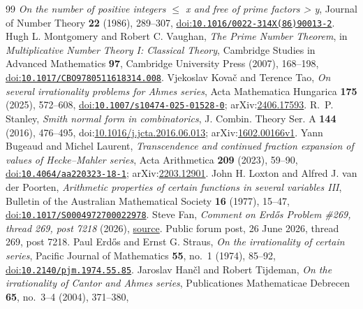 \begin{thebibliography}{99}
  \emph{On the number of positive integers $\le$ x and free of prime factors > y}, Journal of Number Theory \textbf{22} (1986), 289--307,
  \href{https://doi.org/10.1016/0022-314X(86)90013-2}{doi:\nolinkurl{10.1016/0022-314X(86)90013-2}}.
 Hugh L. Montgomery and Robert C. Vaughan,
  \emph{The Prime Number Theorem}, in \emph{Multiplicative Number Theory I: Classical Theory}, Cambridge Studies in Advanced Mathematics \textbf{97}, Cambridge University Press (2007), 168--198,
  \href{https://doi.org/10.1017/CBO9780511618314.008}{doi:\nolinkurl{10.1017/CBO9780511618314.008}}.
 Vjekoslav Kova\v{c} and Terence Tao,
  \emph{On several irrationality problems for Ahmes series}, Acta Mathematica Hungarica \textbf{175} (2025), 572--608,
  \href{https://doi.org/10.1007/s10474-025-01528-0}{doi:\nolinkurl{10.1007/s10474-025-01528-0}}; arXiv:\href{https://arxiv.org/abs/2406.17593}{2406.17593}.
 R.~P. Stanley, \emph{Smith normal form in combinatorics},
  J. Combin. Theory Ser. A \textbf{144} (2016), 476--495,
  doi:\href{https://doi.org/10.1016/j.jcta.2016.06.013}{10.1016/j.jcta.2016.06.013};
  arXiv:\href{https://arxiv.org/abs/1602.00166v1}{1602.00166v1}.
 Yann Bugeaud and Michel Laurent,
  \emph{Transcendence and continued fraction expansion of values of Hecke--Mahler series}, Acta Arithmetica \textbf{209} (2023), 59--90,
  \href{https://doi.org/10.4064/aa220323-18-1}{doi:\nolinkurl{10.4064/aa220323-18-1}}; arXiv:\href{https://arxiv.org/abs/2203.12901}{2203.12901}.
 John H. Loxton and Alfred J. van der Poorten,
  \emph{Arithmetic properties of certain functions in several variables III}, Bulletin of the Australian Mathematical Society \textbf{16} (1977), 15--47,
  \href{https://doi.org/10.1017/S0004972700022978}{doi:\nolinkurl{10.1017/S0004972700022978}}.
 Steve Fan,
  \emph{Comment on Erd\H{o}s Problem \#269, thread 269, post 7218} (2026),
  \href{https://www.erdosproblems.com/forum/thread/269#post-7218}{source}. Public forum post, 26 June 2026, thread 269, post 7218.
 Paul Erd\H{o}s and Ernst G. Straus,
  \emph{On the irrationality of certain series}, Pacific Journal of Mathematics \textbf{55}, no.~1 (1974), 85--92,
  \href{https://doi.org/10.2140/pjm.1974.55.85}{doi:\nolinkurl{10.2140/pjm.1974.55.85}}.
 Jaroslav Han\v{c}l and Robert Tijdeman,
  \emph{On the irrationality of Cantor and Ahmes series}, Publicationes Mathematicae Debrecen \textbf{65}, no.~3--4 (2004), 371--380,

\end{thebibliography}
